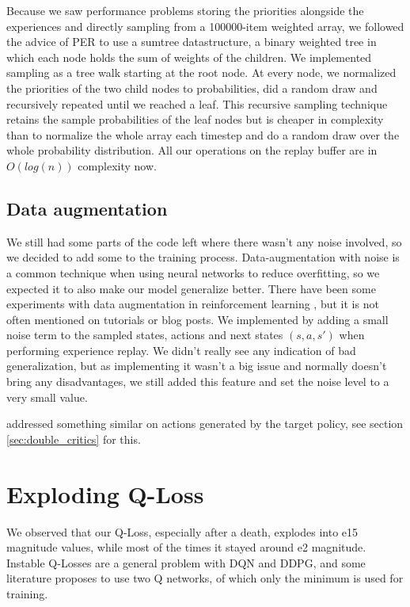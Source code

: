 \documentclass[hyperref,beleg]{cgvpub}
\begin{document}
Because we saw performance problems storing the priorities alongside the experiences and directly sampling from a 100000-item weighted array, we followed the advice of \ac{PER} to use a sumtree datastructure, a binary weighted tree in which each node holds the sum of weights of the children. We implemented sampling as a tree walk starting at the root node. At every node, we normalized the priorities of the two child nodes to probabilities, did a random draw and recursively repeated until we reached a leaf. This recursive sampling technique retains the sample probabilities of the leaf nodes but is cheaper in complexity than to normalize the whole array each timestep and do a random draw over the whole probability distribution. All our operations on the replay buffer are in $O(log(n))$ complexity now.

\subsection{Data augmentation}

We still had some parts of the code left where there wasn't any noise involved, so we decided to add some to the training process. Data-augmentation with noise is a common technique when using neural networks \cite[p.347]{bishopNeuralNetworksPattern1995} to reduce overfitting, so we expected it to also make our model generalize better. There have been some experiments with data augmentation in reinforcement learning \cite{cobbeQuantifyingGeneralizationReinforcement2019}, but it is not often mentioned on tutorials or blog posts. We implemented by adding a small noise term to the sampled states, actions and next states \((s, a, s')\) when performing experience replay. We didn't really see any indication of bad generalization, but as implementing it wasn't a big issue and normally doesn't bring any disadvantages, we still added this feature and set the noise level to a very small value.

\cite{fujimotoAddressingFunctionApproximation2018} addressed something similar on actions generated by the target policy, see section \ref{sec:double_critics} for this.

\section{Exploding Q-Loss}

We observed that our Q-Loss, especially after a death, explodes into e15 magnitude values, while most of the times it stayed around e2 magnitude. Instable Q-Losses are a general problem with DQN and DDPG, and some literature \cite{fujimotoAddressingFunctionApproximation2018} proposes to use two Q networks, of which only the minimum is used for training. 
\end{document}
